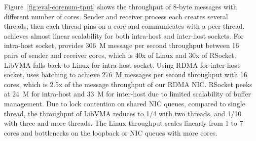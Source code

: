



Figure~\ref{fig:eval-corenum-tput} shows the throughput of 8-byte messages with different number of cores.
Sender and receiver process each creates several threads, then each thread pins on a core and communicates with a peer thread.
\sys achieves almost linear scalability for both intra-host and inter-host sockets.
For intra-host socket, \sys provides 306~M message per second throughput between 16 pairs of sender and receiver cores, which is 40x of Linux and 30x of RSocket.
LibVMA falls back to Linux for intra-host socket.
Using RDMA for inter-host socket, \sys uses batching to achieve 276~M messages per second throughput with 16 cores, which is 2.5x of the message throughput of our RDMA NIC.
RSocket peeks at 24~M for intra-host and 33~M for inter-host due to limited scalability of buffer management.
Due to lock contention on shared NIC queues, compared to single thread, the throughput of LibVMA reduces to 1/4 with two threads, and 1/10 with three and more threads.
The Linux throughput scales linearly from 1 to 7 cores and bottlenecks on the loopback or NIC queues with more cores.

